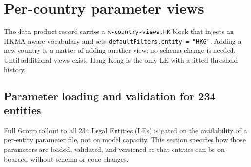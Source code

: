 \documentclass[11pt,a4paper,twoside]{report}
\begin{document}
\section{Per-country parameter views}\label{sec:per-country-views}

The data product record carries a \texttt{x-country-views.HK} block
that injects an HKMA-aware vocabulary and sets
\texttt{defaultFilters.entity = "HKG"}. Adding a new country is a
matter of adding another view; no schema change is needed. Until
additional views exist, Hong Kong is the only LE with a fitted
threshold history.

\subsection{Parameter loading and validation for 234 entities}
\label{sec:params-234}

Full Group rollout to all 234 Legal Entities (LEs) is gated on the
availability of a per-entity parameter file, not on model capacity.
This section specifies how those parameters are loaded, validated,
and versioned so that entities can be on-boarded without schema or
code changes.
\end{document}
